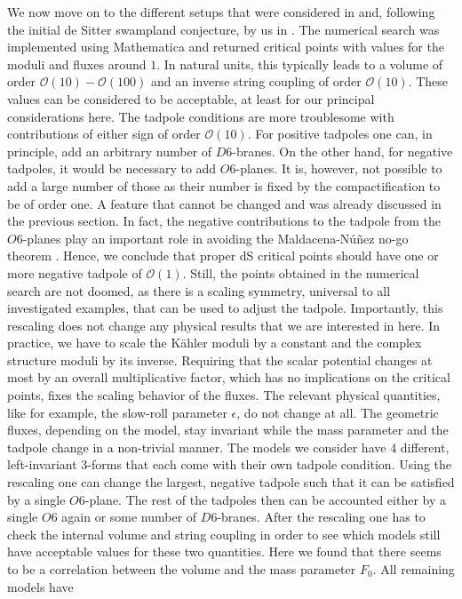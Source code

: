 \documentclass[a4paper,12pt]{report}
\begin{document}
We now move on to the different setups that were considered in \cite{Danielsson:2012et} and, following the initial de Sitter swampland conjecture, by us in \cite{Roupec:2018mbn}. The numerical search was implemented using Mathematica and returned critical points with values for the moduli and fluxes around $1$. In natural units, this typically leads to a volume of order $\mathcal{O}(10)-\mathcal{O}(100)$ and an inverse string coupling of order $\mathcal{O}(10)$. These values can be considered to be acceptable, at least for our principal considerations here. The tadpole conditions are more troublesome with contributions of either sign of order $\mathcal{O}(10)$. For positive tadpoles one can, in principle, add an arbitrary number of $D6$-branes. On the other hand, for negative tadpoles, it would be necessary to add $O6$-planes. It is, however, not possible to add a large number of those as their number is fixed by the compactification to be of order one. A feature that cannot be changed and was already discussed in the previous section. In fact, the negative contributions to the tadpole from the $O6$-planes play an important role in avoiding the Maldacena-N\'{u}\~{n}ez no-go theorem \cite{Maldacena:2000mw}. Hence, we conclude that proper dS critical points should have one or more negative tadpole of $\mathcal{O}(1)$. Still, the points obtained in the numerical search are not doomed, as there is a scaling symmetry, universal to all investigated examples, that can be used to adjust the tadpole. Importantly, this rescaling does not change any physical results that we are interested in here. In practice, we have to scale the Kähler moduli by a constant and the complex structure moduli by its inverse. Requiring that the scalar potential changes at most by an overall multiplicative factor, which has no implications on the critical points, fixes the scaling behavior of the fluxes. The relevant physical quantities, like for example, the slow-roll parameter $\epsilon$, do not change at all. The geometric fluxes, depending on the model, stay invariant while the mass parameter and the tadpole change in a non-trivial manner. The models we consider have $4$ different, left-invariant $3$-forms that each come with their own tadpole condition. Using the rescaling one can change the largest, negative tadpole such that it can be satisfied by a single $O6$-plane. The rest of the tadpoles then can be accounted either by a single $O6$ again or some number of $D6$-branes. After the rescaling one has to check the internal volume and string coupling in order to see which models still have acceptable values for these two quantities. Here we found that there seems to be a correlation between the volume and the mass parameter $F_0$. All remaining models have
\end{document}
